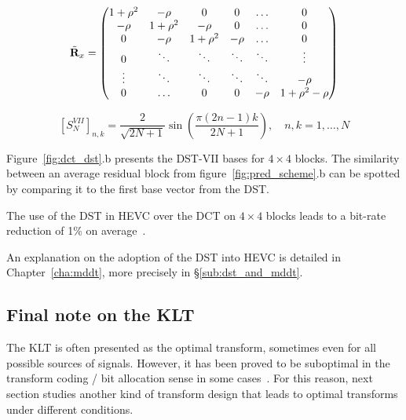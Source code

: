 \documentclass[11pt,a4paper,openright,twoside]{book}
\numberwithin{equation}{section} %
\numberwithin{figure}{section} %
\numberwithin{table}{section} %
\begin{document}
\begin{equation}
	\tilde{\mathbf{R}}_x =
	\begin{pmatrix}
		1+\rho^2 & -\rho    & 0        & 0      & \hdots & 0            \\
		-\rho    & 1+\rho^2 & -\rho    & 0      & \hdots & 0            \\
		0        & -\rho    & 1+\rho^2 & -\rho  & \hdots & 0            \\
		0        & \ddots   & \ddots   & \ddots & \ddots & \vdots       \\
		\vdots   & \ddots   & \ddots   & \ddots & \ddots & -\rho        \\
		0        & \hdots   & 0        & 0      & -\rho  & 1+\rho^2-\rho
	\end{pmatrix}
	\label{eqn:tridiagonal_matrix}
\end{equation}

\begin{equation}
	{\left[S_{N}^{VII} \right]}_{n,k} =
	\frac{2}{\sqrt{2N+1}}\sin\left(\frac{\pi(2n-1)k}{2N+1}\right),
	\quad
	n,k = 1, \dots, N
	\label{eqn:dst_vii}
\end{equation}

Figure~\ref{fig:dct_dst}.b presents the \ac{DST}-VII bases for
$4\times4$ blocks.
The similarity between an average residual block from
figure~\ref{fig:pred_scheme}.b can be spotted by comparing it to the first
base vector from the \ac{DST}.

The use of the \ac{DST} in \ac{HEVC} over the \ac{DCT} on $4\times4$
blocks leads to a bit-rate reduction of 1\% on
average~\cite{sullivan-12-overview-hevc}.

An explanation on the adoption of the \ac{DST} into \ac{HEVC} is detailed in
Chapter~\ref{cha:mddt}, more precisely in \S\ref{sub:dst_and_mddt}.

\subsection{Final note on the \acs{KLT}}
\label{sub:final_note_on_the_klt}

The \ac{KLT} is often presented as the optimal transform, sometimes even for
all possible sources of signals.
However, it has been proved to be suboptimal in the transform coding / bit
allocation sense in some cases~\cite{effros-04-suboptimal-klt}.
For this reason, next section studies another kind of transform design that
leads to optimal transforms under different conditions.
\end{document}
